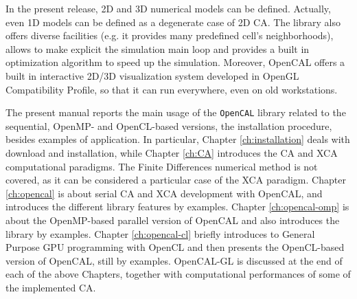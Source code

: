 In the present release, 2D and 3D numerical models can be
defined. Actually, even 1D models can be defined as a degenerate case
of 2D CA. The library also offers diverse facilities (e.g. it provides
many predefined cell's neighborhoods), allows to make explicit the
simulation main loop and provides a built in optimization algorithm to
speed up the simulation. Moreover, OpenCAL offers a built in
interactive 2D/3D visualization system developed in OpenGL
Compatibility Profile, so that it can run everywhere, even on old
workstations.

The present manual reports the main usage of the \verb'OpenCAL'
library related to the sequential, OpenMP- and OpenCL-based versions,
the installation procedure, besides examples of application. In
particular, Chapter \ref{ch:installation} deals with download and
installation, while Chapter \ref{ch:CA} introduces the CA and XCA
computational paradigms. The Finite Differences numerical method is
not covered, as it can be considered a particular case of the XCA
paradigm. Chapter \ref{ch:opencal} is about serial CA and XCA
development with OpenCAL, and introduces the different library features
by examples. Chapter \ref{ch:opencal-omp} is about the OpenMP-based
parallel version of OpenCAL and also introduces the library by
examples. Chapter \ref{ch:opencal-cl} briefly introduces to General
Purpose GPU programming with OpenCL and then presents the OpenCL-based
version of OpenCAL, still by examples. OpenCAL-GL is discussed at the
end of each of the above Chapters, together with computational
performances of some of the implemented CA.


